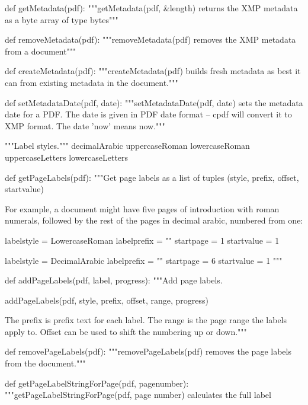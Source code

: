 def getMetadata(pdf):
    """getMetadata(pdf, &length) returns the XMP metadata as a byte array of
    type bytes"""

def removeMetadata(pdf):
    """removeMetadata(pdf) removes the XMP metadata from a document"""

def createMetadata(pdf):
    """createMetadata(pdf) builds fresh metadata as best it can from existing
    metadata in the document."""

def setMetadataDate(pdf, date):
    """setMetadataDate(pdf, date) sets the metadata date for a PDF. The date
    is given in PDF date format -- cpdf will convert it to XMP format. The date
    'now' means now."""

"""Label styles."""
decimalArabic
uppercaseRoman
lowercaseRoman
uppercaseLetters
lowercaseLetters


def getPageLabels(pdf):
    """Get page labels as a list of tuples (style, prefix, offset, startvalue)

    For example, a document might have five pages of introduction with roman
    numerals, followed by the rest of the pages in decimal arabic, numbered
    from one:

    labelstyle = LowercaseRoman
    labelprefix = ""
    startpage = 1
    startvalue = 1

    labelstyle = DecimalArabic
    labelprefix = ""
    startpage = 6
    startvalue = 1 """

def addPageLabels(pdf, label, progress):
    """Add page labels.

    addPageLabels(pdf, style, prefix, offset, range, progress)

    The prefix is prefix text for each label. The range is the page range the
    labels apply to. Offset can be used to shift the numbering up or down."""

def removePageLabels(pdf):
    """removePageLabels(pdf) removes the page labels from the document."""

def getPageLabelStringForPage(pdf, pagenumber):
    """getPageLabelStringForPage(pdf, page number) calculates the full label
